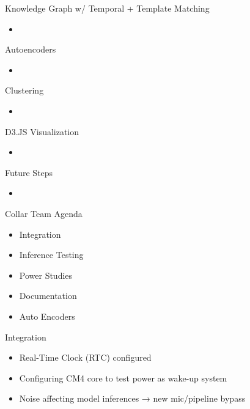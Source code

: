 \begin{frame}{Knowledge Graph w/ Temporal + Template Matching}
    \begin{itemize}
        \item 
    \end{itemize}
\end{frame}

\begin{frame}{Autoencoders}
    \begin{itemize}
        \item 
    \end{itemize}
\end{frame}

\begin{frame}{Clustering}
    \begin{itemize}
        \item 
    \end{itemize}
\end{frame}

\begin{frame}{D3.JS Visualization}
    \begin{itemize}
        \item 
    \end{itemize}
\end{frame}

\begin{frame}{Future Steps}
    \begin{itemize}
        \item 
    \end{itemize}
\end{frame}

\begin{frame}{Collar Team Agenda}
    \begin{itemize}
        \item Integration
        \item Inference Testing
        \item Power Studies
        \item Documentation
        \item Auto Encoders       
    \end{itemize}
\end{frame}

\begin{frame}{Integration}
    \begin{itemize}
        \item Real-Time Clock (RTC) configured
        \item Configuring CM4 core to test power as wake-up system
        \item Noise affecting model inferences → new mic/pipeline bypass
    \end{itemize}
\end{frame}

